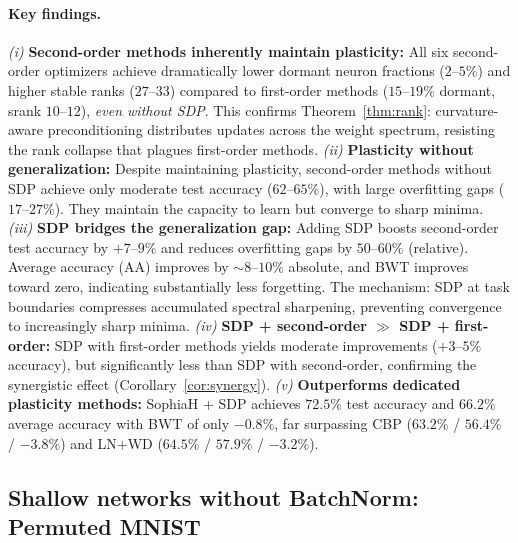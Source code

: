 \documentclass{article}
\begin{document}
\paragraph{Key findings.}
\emph{(i)} \textbf{Second-order methods inherently maintain plasticity:} All six second-order optimizers achieve dramatically lower dormant neuron fractions ($2$--$5\%$) and higher stable ranks ($27$--$33$) compared to first-order methods ($15$--$19\%$ dormant, srank $10$--$12$), \emph{even without SDP}. This confirms Theorem~\ref{thm:rank}: curvature-aware preconditioning distributes updates across the weight spectrum, resisting the rank collapse that plagues first-order methods.
\emph{(ii)} \textbf{Plasticity without generalization:} Despite maintaining plasticity, second-order methods without SDP achieve only moderate test accuracy ($62$--$65\%$), with large overfitting gaps ($17$--$27\%$). They maintain the capacity to learn but converge to sharp minima.
\emph{(iii)} \textbf{SDP bridges the generalization gap:} Adding SDP boosts second-order test accuracy by $+7$--$9\%$ and reduces overfitting gaps by $50$--$60\%$ (relative). Average accuracy (AA) improves by $\sim8$--$10\%$ absolute, and BWT improves toward zero, indicating substantially less forgetting. The mechanism: SDP at task boundaries compresses accumulated spectral sharpening, preventing convergence to increasingly sharp minima.
\emph{(iv)} \textbf{SDP + second-order $\gg$ SDP + first-order:} SDP with first-order methods yields moderate improvements ($+3$--$5\%$ accuracy), but significantly less than SDP with second-order, confirming the synergistic effect (Corollary~\ref{cor:synergy}).
\emph{(v)} \textbf{Outperforms dedicated plasticity methods:} SophiaH + SDP achieves $72.5\%$ test accuracy and $66.2\%$ average accuracy with BWT of only $-0.8\%$, far surpassing CBP ($63.2\%$ / $56.4\%$ / $-3.8\%$) and LN+WD ($64.5\%$ / $57.9\%$ / $-3.2\%$).

\subsection{Shallow networks without BatchNorm: Permuted MNIST}
\end{document}
